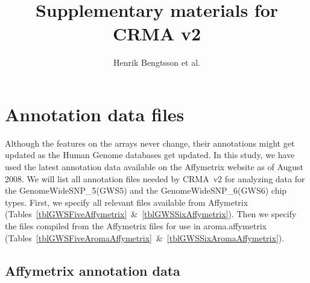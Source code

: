 \documentclass[10pt,a4paper]{article}
\newcommand{\GWSFivef}{GenomeWideSNP\_5\xspace}
\newcommand{\GWSSixf}{GenomeWideSNP\_6\xspace}
\begin{document}
\title{Supplementary materials for CRMA v2}
\author{Henrik Bengtsson et al.}
\maketitle
\tableofcontents

\clearpage
\section{Annotation data files}
Although the features on the arrays never change, their annotations might get updated as the Human Genome databases get updated.  In this study, we have used the latest annotation data available on the Affymetrix website as of August 2008.
We will list all annotation files needed by CRMA~v2 for analyzing data for the \GWSFivef (GWS5) and the \GWSSixf (GWS6) chip types.  First, we specify all relevant files available from Affymetrix (Tables~\ref{tblGWSFiveAffymetrix}~\&~\ref{tblGWSSixAffymetrix}).  Then we specify the files compiled from the Affymetrix files for use in aroma.affymetrix (Tables~\ref{tblGWSFiveAromaAffymetrix}~\&~\ref{tblGWSSixAromaAffymetrix}).

\subsection{Affymetrix annotation data}
\end{document}
